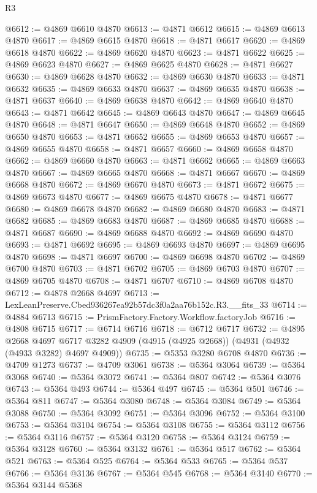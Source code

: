 \begin{lexlean}{R3}
\begin{coremodule}
@6612 := @4869 @6610 @4870
@6613 := @4871 @6612
@6615 := @4869 @6613 @4870
@6617 := @4869 @6615 @4870
@6618 := @4871 @6617
@6620 := @4869 @6618 @4870
@6622 := @4869 @6620 @4870
@6623 := @4871 @6622
@6625 := @4869 @6623 @4870
@6627 := @4869 @6625 @4870
@6628 := @4871 @6627
@6630 := @4869 @6628 @4870
@6632 := @4869 @6630 @4870
@6633 := @4871 @6632
@6635 := @4869 @6633 @4870
@6637 := @4869 @6635 @4870
@6638 := @4871 @6637
@6640 := @4869 @6638 @4870
@6642 := @4869 @6640 @4870
@6643 := @4871 @6642
@6645 := @4869 @6643 @4870
@6647 := @4869 @6645 @4870
@6648 := @4871 @6647
@6650 := @4869 @6648 @4870
@6652 := @4869 @6650 @4870
@6653 := @4871 @6652
@6655 := @4869 @6653 @4870
@6657 := @4869 @6655 @4870
@6658 := @4871 @6657
@6660 := @4869 @6658 @4870
@6662 := @4869 @6660 @4870
@6663 := @4871 @6662
@6665 := @4869 @6663 @4870
@6667 := @4869 @6665 @4870
@6668 := @4871 @6667
@6670 := @4869 @6668 @4870
@6672 := @4869 @6670 @4870
@6673 := @4871 @6672
@6675 := @4869 @6673 @4870
@6677 := @4869 @6675 @4870
@6678 := @4871 @6677
@6680 := @4869 @6678 @4870
@6682 := @4869 @6680 @4870
@6683 := @4871 @6682
@6685 := @4869 @6683 @4870
@6687 := @4869 @6685 @4870
@6688 := @4871 @6687
@6690 := @4869 @6688 @4870
@6692 := @4869 @6690 @4870
@6693 := @4871 @6692
@6695 := @4869 @6693 @4870
@6697 := @4869 @6695 @4870
@6698 := @4871 @6697
@6700 := @4869 @6698 @4870
@6702 := @4869 @6700 @4870
@6703 := @4871 @6702
@6705 := @4869 @6703 @4870
@6707 := @4869 @6705 @4870
@6708 := @4871 @6707
@6710 := @4869 @6708 @4870
@6712 := @4878 @2668 @4697
@6713 := LexLeanPreserve.Cbed936267ea92b57dc3f0a2aa76b152c.R3.__fits_33
@6714 := @4884 @6713
@6715 := PrismFactory.Factory.Workflow.factoryJob
@6716 := @4808 @6715
@6717 := @6714 @6716
@6718 := @6712 @6717
@6732 := @4895
    @2668
    @4697
    @6717
    @3282
    @4909
    (@4915 (@4925 @2668))
    (@4931 (@4932 (@4933 @3282) @4697 @4909))
@6735 := @5353 @3280 @6708 @4870
@6736 := @4709 @1273
@6737 := @4709 @3061
@6738 := @5364 @3064
@6739 := @5364 @3068
@6740 := @5364 @3072
@6741 := @5364 @807
@6742 := @5364 @3076
@6743 := @5364 @493
@6744 := @5364 @497
@6745 := @5364 @501
@6746 := @5364 @811
@6747 := @5364 @3080
@6748 := @5364 @3084
@6749 := @5364 @3088
@6750 := @5364 @3092
@6751 := @5364 @3096
@6752 := @5364 @3100
@6753 := @5364 @3104
@6754 := @5364 @3108
@6755 := @5364 @3112
@6756 := @5364 @3116
@6757 := @5364 @3120
@6758 := @5364 @3124
@6759 := @5364 @3128
@6760 := @5364 @3132
@6761 := @5364 @517
@6762 := @5364 @521
@6763 := @5364 @525
@6764 := @5364 @533
@6765 := @5364 @537
@6766 := @5364 @3136
@6767 := @5364 @545
@6768 := @5364 @3140
@6770 := @5364 @3144 @5368

\end{coremodule}
\end{lexlean}
